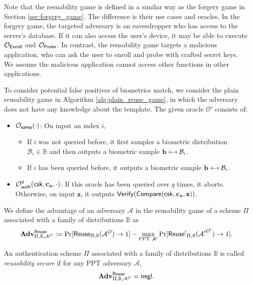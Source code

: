 Note that the resuability game is defined in a similar way as the forgery game in Section \ref{sec:forgery_game}. The difference is their use cases and oracles. In the forgery game, the targeted adversary is an eavesdropper who has access to the server's database. If it can also access the user's device, it may be able to execute $\mathcal{O}_{\sf Enroll}$ and $\mathcal{O}_{\sf Probe}$. In contrast, the reusability game targets a malicious application, who can ask the user to enroll and probe with crafted secret keys. We assume the malicious application cannot access other functions in other applications.

To consider potential false positives of biometrics match, we consider the plain reusability game in Algorithm \ref{alg:plain_reuse_game}, in which the adversary does not have any knowledge about the template. The given oracle $\mathcal{O'}$ consists of:

\begin{itemize}

	\item $\mathcal{O}_{\sf samp}(\cdot)$: On input an index $i$,
	\begin{itemize}
		\item If $i$ was not queried before, it first samples a biometric distribution $\mathcal{B}_i \in \mathbb{B}$ and then outputs a biometric sample $\mathbf{b} \getsdollar \mathcal{B}_i$.
		\item If $i$ has been queried before, it outputs a biometric sample $\mathbf{b} \getsdollar \mathcal{B}_i$.
	\end{itemize}
	
	\item $\mathcal{O}_{\sf auth}^{q}({\sf csk}, \mathbf{c_x}, \cdot)$: If this oracle has been queried over $q$ times, it aborts. Otherwise, on input $\mathbf{z}$, it outputs ${\sf Verify}({\sf Compare}({\sf csk}, \mathbf{c_x}, \mathbf{z}))$.

\end{itemize}


We define the advantage of an adversary $\mathcal{A}$ in the reusability game of a scheme $\Pi$ associated with a family of distributions $\mathbb{B}$ as
\[
	\mathbf{Adv}^{\sf Reuse}_{\Pi, \mathbb{B}, \mathcal{A}^\mathcal{O}} := \Pr[{\sf Reuse}_{\Pi, \mathbb{B}}(\mathcal{A}^\mathcal{O}) \to 1] -
	\max_{\text{PPT } \mathcal{A}'} \Pr[{\sf Reuse'}_{\Pi, \mathbb{B}}(\mathcal{A'}^\mathcal{O'}) \to 1].
\]

An authentication scheme $\Pi$ associated with a family of distributions $\mathbb{B}$ is called \emph{reusability secure} if for any PPT adversary $\mathcal{A}$,
\[
	\mathbf{Adv}^{\sf Reuse}_{\Pi, \mathbb{B}, \mathcal{A^\mathcal{O}}} = \mathsf{negl}.
\]

